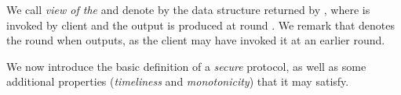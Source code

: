 \begin{definition}
    We call \emph{view of the} \podtm and denote by \podView{\client}{\round} the data structure returned by \opreadall{}, where \opreadall{} is invoked by client \client and the output is produced at round \round.
    We remark that \round denotes the round when \opreadall{} outputs, as the client may have invoked it at an earlier round.
\end{definition}

We now introduce the basic definition of a \emph{secure} \podtm protocol, as well as some additional properties (\emph{timeliness} and \emph{monotonicity}) that it may satisfy.

